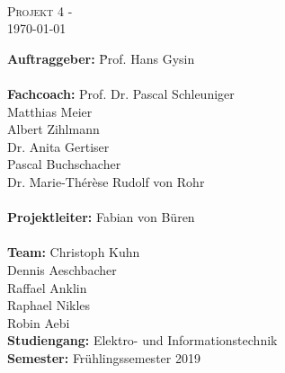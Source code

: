 \documentclass[final]{fhnwreport}       %
\begin{document}
	\begin{center}
		\vspace*{2cm}
		{\huge{\textbf{\thetitle}}}\\
		\vspace*{0.5cm}
		
		{\scshape\Large Projekt 4 - \theauthor \\} \Large{\today}
		\vfill
		\begin{normalsize}
			{\begin{tabbing}
					\textbf{Auftraggeber:} \hspace{5cm}\= Prof. Hans Gysin\\
					
					\\[0.8cm]
					\textbf{Fachcoach:} 
					\>Prof. Dr. Pascal Schleuniger\\
					\>Matthias Meier\\
					\>Albert Zihlmann\\
					\>Dr. Anita Gertiser\\
					\>Pascal Buchschacher\\
					\>Dr. Marie-Thérèse Rudolf von Rohr\\
					
					\\[0.4cm]
					\textbf{Projektleiter:} \>Fabian von Büren\\
					\\[0.4cm]
					
					\textbf{Team:} \>Christoph Kuhn \\ \>Dennis Aeschbacher \\ \>Raffael Anklin \\ \>Raphael Nikles \\ \>Robin Aebi
					\\[0.8cm]
					\textbf{Studiengang:} \>Elektro- und Informationstechnik
					\\[0.8cm]	\textbf{Semester:} \>Frühlingssemester 2019
			\end{tabbing}}
		\end{normalsize}
		\vfill
	\end{center}
\clearpage


\tableofcontents
\clearpage


	
	
	
\pagebreak
\end{document}
